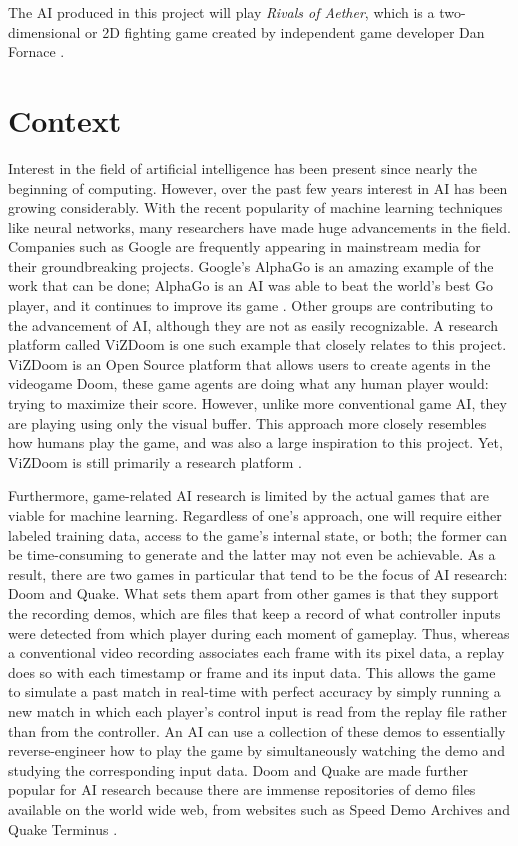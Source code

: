  The AI produced in this project will play \textit{Rivals of Aether}, which is a two-dimensional or 2D fighting game created by independent game developer Dan Fornace \cite{RivalsofAether}.




\section{Context}

Interest in the field of artificial intelligence has been present since nearly the beginning of computing. However, over the past few years interest in AI has been growing considerably. With the recent popularity of machine learning techniques like neural networks, many researchers have made huge advancements in the field. Companies such as Google are frequently appearing in mainstream media for their groundbreaking projects. Google's AlphaGo is an amazing example of the work that can be done; AlphaGo is an AI was able to beat the world's best Go player, and it continues to improve its game \cite{AlphaGo}. Other groups are contributing to the advancement of AI, although they are not as easily recognizable. A research platform called ViZDoom is one such example that closely relates to this project. ViZDoom is an Open Source platform that allows users to create agents in the videogame Doom, these game agents are doing what any human player would: trying to maximize their score. However, unlike more conventional game AI, they are playing using only the visual buffer. This approach more closely resembles how humans play the game, and was also a large inspiration to this project. Yet, ViZDoom is still primarily a research platform \cite{Kempka:2016}.

Furthermore, game-related AI research is limited by the actual games that are viable for machine learning. Regardless of one's approach, one will require either labeled training data, access to the game's internal state, or both; the former can be time-consuming to generate and the latter may not even be achievable. As a result, there are two games in particular that tend to be the focus of AI research: Doom and Quake. What sets them apart from other games is that they support the recording demos, which are files that keep a record of what controller inputs were detected from which player during each moment of gameplay. Thus, whereas a conventional video recording associates each frame with its pixel data, a replay does so with each timestamp or frame and its input data. This allows the game to simulate a past match in real-time with perfect accuracy by simply running a new match in which each player's control input is read from the replay file rather than from the controller. An AI can use a collection of these demos to essentially reverse-engineer how to play the game by simultaneously watching the demo and studying the corresponding input data. Doom and Quake are made further popular for AI research because there are immense repositories of demo files available on the world wide web, from websites such as Speed Demo Archives and Quake Terminus \cite{Thurau:2004}.

